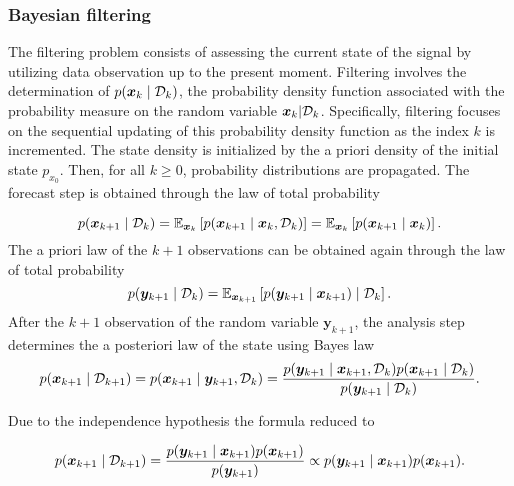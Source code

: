 \subsubsection{Bayesian filtering}

The filtering problem consists of assessing the current state of the signal by utilizing data observation up to the present moment. Filtering involves the determination of $p(\bm{x}_{k} \mid \mathcal{D}_{k})$, the probability density function associated with the probability measure on the random variable $\bm{x}_{k} | \mathcal D_{k}$. Specifically, filtering focuses on the sequential updating of this probability density function as the index $k$ is incremented.
The state density is initialized by the a priori density of the initial state $p_{x_0}$.
Then, for all $k \geq 0$, probability distributions are propagated.
The forecast step is obtained through the law of total probability

\begin{equation*}
    p(\bm{x}_{k+1} \mid \mathcal D_k) = \mathbb{E}_{\bm{x}_k}\left[p(\bm{x}_{k+1} \mid  \bm{x}_k,\mathcal{D}_k)\right] = \mathbb{E}_{\bm{x}_k}\left[p(\bm{x}_{k+1} \mid \bm{x}_k)\right].
\end{equation*}
The a priori law of the $k+1$ observations can be obtained again through the law of total probability
\begin{equation*}
    p(\bm y_{k+1} \mid \mathcal D_k) = \mathbb{E}_{\bm{x}_{k+1}}\left[p(\bm y_{k+1}\mid \bm{x}_{k+1}) \mid \mathcal D_k\right].
\end{equation*}
After the $k+1$ observation of the random variable $\bm y_{k+1}$, the analysis step determines the a posteriori law of the state using Bayes law
\begin{equation*}
    p(\bm{x}_{k+1} \mid \mathcal D_{k+1}) = p(\bm{x}_{k+1} \mid \bm y_{k+1}, \mathcal D_{k})  = \frac{p(\bm y_{k+1} \mid \bm{x}_{k+1} ,\mathcal D_k)  p(\bm{x}_{k+1}\mid \mathcal D_k)}{p(\bm y_{k+1}\mid \mathcal D_k)}.
\end{equation*}

Due to the independence hypothesis the formula reduced to

\begin{equation*}
    p(\bm{x}_{k+1} \mid \mathcal D_{k+1}) = \frac{p(\bm y_{k+1} \mid \bm{x}_{k+1})  p(\bm{x}_{k+1})}{p(\bm y_{k+1})} \propto p(\bm y_{k+1} \mid \bm{x}_{k+1})  p(\bm{x}_{k+1}).
\end{equation*}

